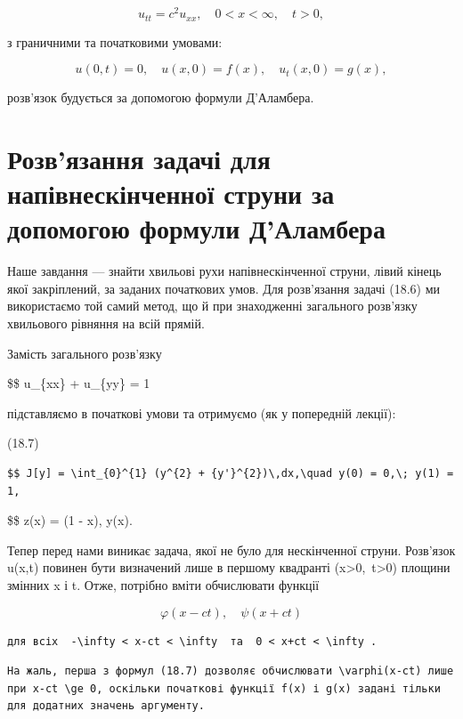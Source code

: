 \documentclass[
  ukrainian,
]{article}
\begin{document}
\[
u_{tt}=c^2u_{xx}, \quad 0<x<\infty,\quad t>0,
\]

з граничними та початковими умовами:

\[
u(0,t)=0,\quad u(x,0)=f(x),\quad u_t(x,0)=g(x),
\]

розв'язок будується за допомогою формули Д'Аламбера.

\section{Розв'язання задачі для напівнескінченної струни за допомогою
формули
Д'Аламбера}\label{ux440ux43eux437ux432ux44fux437ux430ux43dux43dux44f-ux437ux430ux434ux430ux447ux456-ux434ux43bux44f-ux43dux430ux43fux456ux432ux43dux435ux441ux43aux456ux43dux447ux435ux43dux43dux43eux457-ux441ux442ux440ux443ux43dux438-ux437ux430-ux434ux43eux43fux43eux43cux43eux433ux43eux44e-ux444ux43eux440ux43cux443ux43bux438-ux434ux430ux43bux430ux43cux431ux435ux440ux430}

Наше завдання --- знайти хвильові рухи напівнескінченної струни, лівий
кінець якої закріплений, за заданих початкових умов. Для розв'язання
задачі (18.6) ми використаємо той самий метод, що й при знаходженні
загального розв'язку хвильового рівняння на всій прямій.

Замість загального розв'язку

\$\$ u\_\{xx\} + u\_\{yy\} = 1

підставляємо в початкові умови та отримуємо (як у попередній лекції):

(18.7)

\begin{verbatim}
$$ J[y] = \int_{0}^{1} (y^{2} + {y'}^{2})\,dx,\quad y(0) = 0,\; y(1) = 1,
\end{verbatim}

\$\$ z(x) = (1 - x), y(x).

Тепер перед нами виникає задача, якої не було для нескінченної струни.
Розв'язок u(x,t) повинен бути визначений лише в першому квадранті
(x\textgreater0,~t\textgreater0) площини змінних x і t. Отже, потрібно
вміти обчислювати функції

\[
\varphi(x-ct), \quad \psi(x+ct)
\]

\begin{verbatim}
для всіх  -\infty < x-ct < \infty  та  0 < x+ct < \infty .
\end{verbatim}

\begin{verbatim}
На жаль, перша з формул (18.7) дозволяє обчислювати \varphi(x-ct) лише при x-ct \ge 0, оскільки початкові функції f(x) і g(x) задані тільки для додатних значень аргументу.
\end{verbatim}
\end{document}
